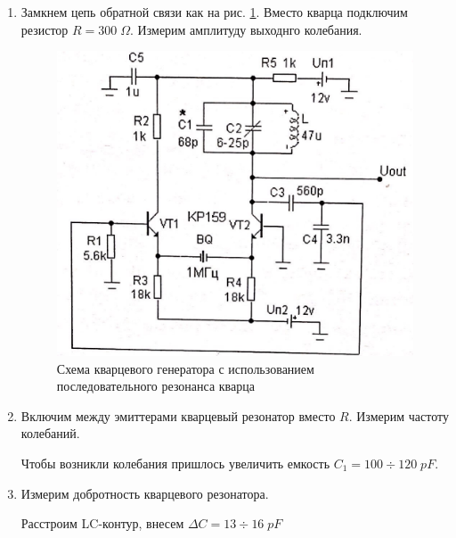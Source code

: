 \documentclass[a4paper]{article}
\begin{document}
\begin{enumerate}
    \item Замкнем цепь обратной связи как на рис. \ref{scheme_2}. Вместо кварца подключим резистор $R = 300\; \Omega.$ Измерим амплитуду выходнго колебания. \par 
    \begin{center}
    \end{center}
    
    \begin{figure}[H]
        \begin{center}
            \includegraphics[scale = 0.2]{scheme_2.jpg}
            \caption{Схема кварцевого генератора с использованием последовательного резонанса кварца}
            \label{scheme_2}
        \end{center}
    \end{figure}


    \item Включим между эмиттерами кварцевый резонатор вместо $R$. Измерим частоту колебаний. \par 
    
    Чтобы возникли колебания пришлось увеличить емкость $C_1 = 100 \div 120\; pF$.
    \begin{center}
    \end{center}


    \item Измерим добротность кварцевого резонатора. \par 
    Расстроим LC-контур, внесем $\Delta C = 13 \div 16\; pF$


\end{enumerate}
\end{document}
